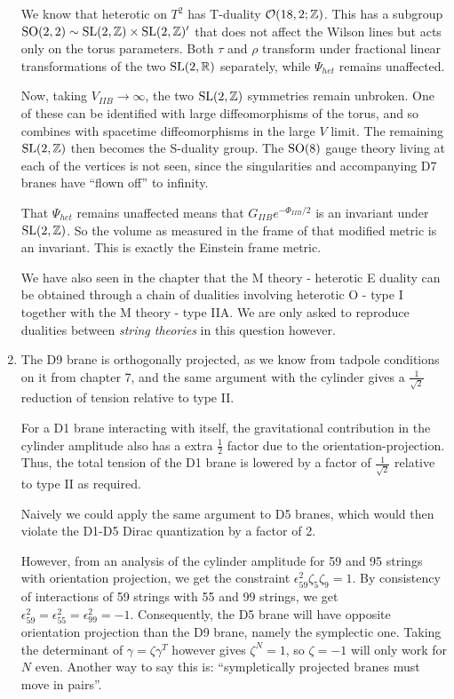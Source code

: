 \documentclass[11pt, class=article, crop=false]{standalone}
\begin{document}
\begin{enumerate}
	We know that heterotic on $T^2$ has T-duality $\mathcal{O}(18, 2; \mathbb{Z})$. This has a subgroup $\mathrm{SO}(2,2) \sim \mathrm{SL}(2, \mathbb{Z}) \times \mathrm{SL}(2, \mathbb{Z})'$ that does not affect the Wilson lines but acts only on the torus parameters. Both $\tau$ and $\rho$ transform under fractional linear transformations of the two $\mathrm{SL}(2, \mathbb{R})$ separately, while $\Psi_{het}$ remains unaffected.
	
	Now, taking $V_{IIB} \to \infty$, the two $\mathrm{SL}(2, \mathbb{Z})$ symmetries remain unbroken. One of these can be identified with large diffeomorphisms of the torus, and so combines with spacetime diffeomorphisms in the large $V$ limit. The remaining $\mathrm{SL}(2, \mathbb{Z})$ then becomes the S-duality group. The $\mathrm{SO}(8)$ gauge theory living at each of the vertices is not seen, since the singularities and accompanying D7 branes have ``flown off'' to infinity. 
	
	That $\Psi_{het}$ remains unaffected means that $G_{IIB} e^{-\Phi_{IIB}/2}$ is an invariant under $\mathrm{SL}(2, \mathbb{Z})$. So the volume as measured in the frame of that modified metric is an invariant. This is exactly the Einstein frame metric. 
	
	We have also seen in the chapter that the M theory - heterotic E duality can be obtained through a chain of dualities involving heterotic O - type I together with the M theory - type IIA. We are only asked to reproduce dualities between \emph{string theories} in this question however. 
	
	\item The D9 brane is orthogonally projected, as we know from tadpole conditions on it from chapter 7, and the same argument with the cylinder gives a $\frac{1}{\sqrt2}$ reduction of tension relative to type II. 
	
	For a D1 brane interacting with itself, the gravitational contribution in the cylinder amplitude also has a extra $\frac12$ factor due to the orientation-projection. Thus, the total tension of the D1 brane is lowered by a factor of $\frac1{\sqrt{2}}$ relative to type II as required. 
	
	Naively we could apply the same argument to D5 branes, which would then violate the D1-D5 Dirac quantization by a factor of 2.
	
	However, from an analysis of the cylinder amplitude for 59 and 95 strings with orientation projection, we get the constraint $\epsilon^2_{59} \zeta_5 \zeta_9 = 1$. By consistency of interactions of 59 strings with 55 and 99 strings, we get $\epsilon_{59}^2 = \epsilon_{55}^2 = \epsilon_{99}^2 = -1$. Consequently, the D5 brane will have opposite orientation projection than the D9 brane, namely the symplectic one. Taking the determinant of $\gamma = \zeta \gamma^T$ however gives $\zeta^N = 1$, so $\zeta = -1$ will only work for $N$ even. Another way to say this is: ``sympletically projected branes must move in pairs''. 
	

\end{enumerate}
\end{document}
